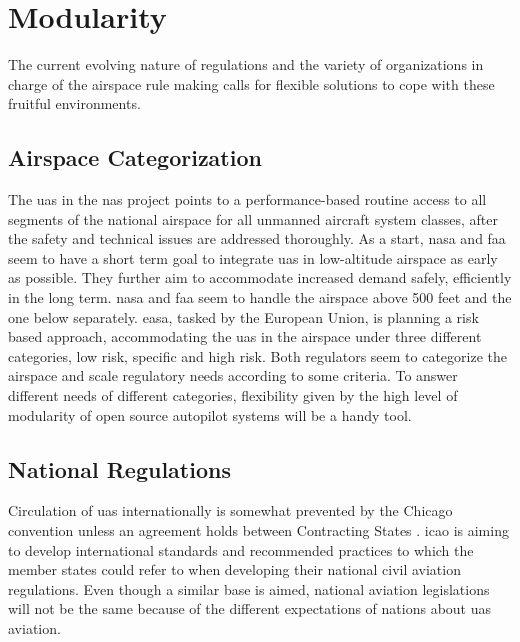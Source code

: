 \section{Modularity}\label{ch2:modularity}

The current evolving nature of regulations and the variety of organizations in charge 
of the airspace rule making calls for flexible solutions to cope with these fruitful environments. 

\subsection{Airspace Categorization}
The \gls{uas} in the \gls{nas} project points to a performance-based routine access to 
all segments of the national airspace for all unmanned aircraft system classes, after the 
safety and technical issues are addressed thoroughly. As a start, \gls{nasa} and faa 
seem to have a short term goal to integrate \gls{uas} in low-altitude airspace as early 
as possible. They further aim to accommodate increased demand safely, efficiently in 
the long term. \gls{nasa} and faa seem to handle the airspace above 500 feet and the 
one below separately. easa, tasked by the European Union, is planning a risk based approach, 
accommodating the \gls{uas} in the airspace under three different categories, low risk, 
specific and high risk. Both regulators seem to categorize the airspace and scale regulatory 
needs according to some criteria. To answer different needs of different categories, flexibility 
given by the high level of modularity of open source autopilot systems will be a handy tool. 

\subsection{National Regulations}
Circulation of \gls{uas} internationally is somewhat prevented by the Chicago convention 
unless an agreement holds between Contracting States \cite{A_NPA_EASA2015}. \gls{icao} is aiming 
to develop international standards and recommended practices to which the member states 
could refer to when developing their national civil aviation regulations. Even though a similar 
base is aimed, national aviation legislations will not be the same because of the different 
expectations of nations about \gls{uas} aviation. 

